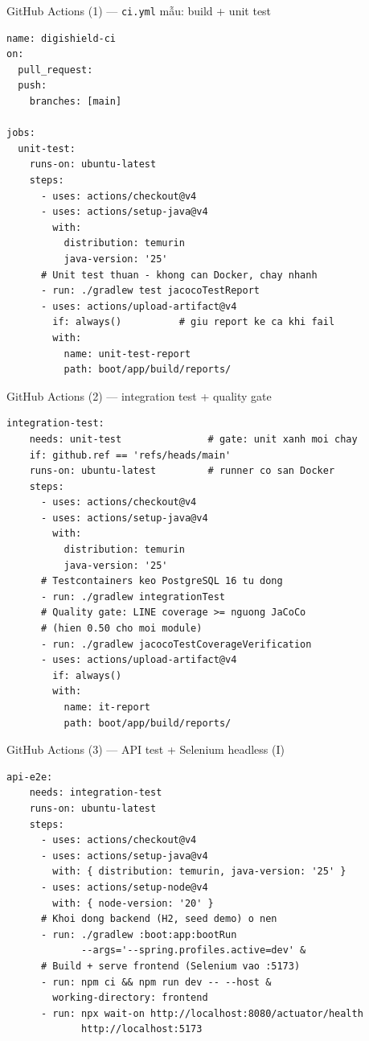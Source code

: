 \documentclass[aspectratio=169,12pt]{beamer}
\begin{document}
\begin{frame}[fragile]{GitHub Actions (1) --- \texttt{ci.yml} mẫu: build + unit test}
  \vspace*{-0.6em}
\begin{lstlisting}[basicstyle=\ttfamily\scriptsize]
name: digishield-ci
on:
  pull_request:
  push:
    branches: [main]

jobs:
  unit-test:
    runs-on: ubuntu-latest
    steps:
      - uses: actions/checkout@v4
      - uses: actions/setup-java@v4
        with:
          distribution: temurin
          java-version: '25'
      # Unit test thuan - khong can Docker, chay nhanh
      - run: ./gradlew test jacocoTestReport
      - uses: actions/upload-artifact@v4
        if: always()          # giu report ke ca khi fail
        with:
          name: unit-test-report
          path: boot/app/build/reports/
\end{lstlisting}
\end{frame}

\begin{frame}[fragile]{GitHub Actions (2) --- integration test + quality gate}
\begin{lstlisting}[basicstyle=\ttfamily\scriptsize]
  integration-test:
    needs: unit-test               # gate: unit xanh moi chay
    if: github.ref == 'refs/heads/main'
    runs-on: ubuntu-latest         # runner co san Docker
    steps:
      - uses: actions/checkout@v4
      - uses: actions/setup-java@v4
        with:
          distribution: temurin
          java-version: '25'
      # Testcontainers keo PostgreSQL 16 tu dong
      - run: ./gradlew integrationTest
      # Quality gate: LINE coverage >= nguong JaCoCo
      # (hien 0.50 cho moi module)
      - run: ./gradlew jacocoTestCoverageVerification
      - uses: actions/upload-artifact@v4
        if: always()
        with:
          name: it-report
          path: boot/app/build/reports/
\end{lstlisting}
\end{frame}

\begin{frame}[fragile]{GitHub Actions (3) --- API test + Selenium headless (I)}
  \vspace*{-0.4em}
\begin{lstlisting}[basicstyle=\ttfamily\scriptsize]
  api-e2e:
    needs: integration-test
    runs-on: ubuntu-latest
    steps:
      - uses: actions/checkout@v4
      - uses: actions/setup-java@v4
        with: { distribution: temurin, java-version: '25' }
      - uses: actions/setup-node@v4
        with: { node-version: '20' }
      # Khoi dong backend (H2, seed demo) o nen
      - run: ./gradlew :boot:app:bootRun
             --args='--spring.profiles.active=dev' &
      # Build + serve frontend (Selenium vao :5173)
      - run: npm ci && npm run dev -- --host &
        working-directory: frontend
      - run: npx wait-on http://localhost:8080/actuator/health
             http://localhost:5173
\end{lstlisting}
\end{frame}
\end{document}
